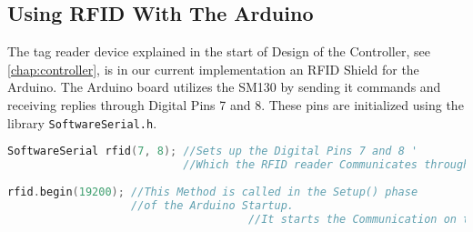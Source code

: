 \subsection{Using RFID With The Arduino}
\label{sec:rfidsect}
The tag reader device explained in the start of Design of the Controller, see \vref{chap:controller}, is in our current implementation an RFID Shield for the Arduino.
The Arduino board utilizes the SM130 by sending it commands and receiving replies through Digital Pins 7 and 8.
These pins are initialized using the library \verb|SoftwareSerial.h|.\\
\begin{lstlisting}[frame=single, language=C, label=pageRFID, caption=The RFID Code Initialization.]
SoftwareSerial rfid(7, 8); //Sets up the Digital Pins 7 and 8 '
                           //Which the RFID reader Communicates through.
													
rfid.begin(19200); //This Method is called in the Setup() phase 
                   //of the Arduino Startup.
									 //It starts the Communication on the standard baud rate
\end{lstlisting}

